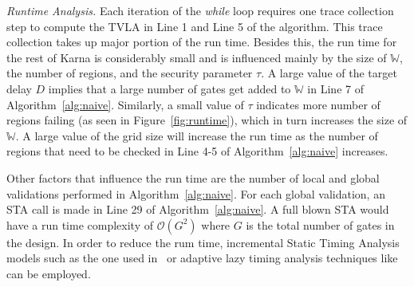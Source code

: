 {\flushleft \em Runtime Analysis.} Each iteration of the {\em while} loop requires one trace collection step  to compute the TVLA in Line 1 and Line 5 of the algorithm. This trace collection takes up major portion of the run time. Besides this, the run time for the rest of {\sf Karna} is considerably small and is influenced mainly by the size of $\mathbb W$, the number of regions, and the security parameter $\tau$. 
A large value of the target delay $D$ implies that a large number of gates get added to $\mathbb W$ in Line 7 of Algorithm~\ref{alg:naive}. Similarly, a small value of $\tau$ indicates more number of regions failing (as seen in Figure~\ref{fig:runtime}), which in turn increases the size of $\mathbb W$. 
A  large value of the grid size will increase the run time as the number of regions that need to be checked in Line 4-5 of Algorithm~\ref{alg:naive} increases. 

Other factors that influence the run time are the number of local and global validations performed in Algorithm~\ref{alg:naive}. For each global validation, an STA call is made in Line 29 of Algorithm~\ref{alg:naive}. A full blown STA would have a run time complexity of $\mathcal{O} ( G^{2})$ where $G$ is the total number of gates in the design. In order to reduce the rum time, incremental Static Timing Analysis models such as the one used in~\cite{hu:12} or adaptive lazy timing analysis techniques like~\cite{MLTimer} can be employed. 










